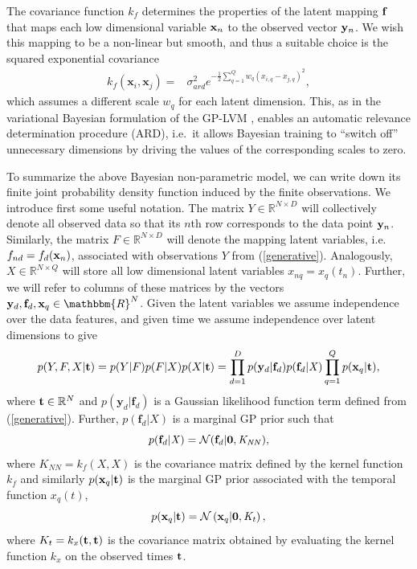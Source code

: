 \documentclass{article} %
\begin{document}
% 
The covariance function $k_f$ determines the properties of the latent
mapping $\mathbf{f}$ that maps each low dimensional variable $\mathbf{x}_n$ to the
observed vector $\mathbf{y}_n$. We wish this mapping to be a non-linear but
smooth, and thus a suitable choice is the squared exponential
covariance
\begin{align}
\mathit{k_f} \left( \mathbf{x}_i, \mathbf{x}_j \right) = {} &  
		\sigma_{ard}^2 e^{
			- \frac{1}{2} \sum_{q=1}^{Q}  w_q \left(
                          \mathit{x_{i,q} - x_{j,q}} \right) ^2 },
\label{rbfard}
\end{align}
which assumes a different scale $w_q$ for each latent dimension. This,
as in the variational Bayesian formulation of the GP-LVM
\cite{BayesianGPLVM}, enables an automatic relevance determination
procedure (ARD), i.e.\ it allows Bayesian training to ``switch off''
unnecessary dimensions by driving the values of the corresponding
scales to zero.

To summarize the above Bayesian non-parametric model, we can write
down its finite joint probability density function induced by the
finite observations. We introduce first some useful notation. The
matrix $\mathit{Y} \in \mathbb{R}^{N \times D}$ will collectively
denote all observed data so that its $n$th row corresponds to the data
point $\mathbf{y}_n$. Similarly, the matrix $F \in \mathbb{R}^{N \times D}$
will denote the mapping latent variables, i.e.\ $f_{nd} =f_d(\mathbf{x}_n)$,
associated with observations $Y$ from (\ref{generative}). Analogously,
$X \in \mathbb{R}^{N \times Q}$ will store all low dimensional latent
variables $x_{nq}=x_q(t_n)$. Further, we will refer to columns of
these matrices by the vectors $\bfy_d,\bff_d, \bfx_q \in
\mathbbm{R}^N$. Given the latent variables we assume independence over
the data features, and given time we assume independence over latent
dimensions to give
\begin{equation}
\label{joint}
p(Y,F, X | \mathbf{t}) = p(Y|F) p(F|X) p(X |\mathbf{t})= 
 \prod_{d=1}^D  p(\mathbf{y}_d | \mathbf{f}_d) p(\mathbf{f}_d |
 \mathit{X}) \prod_{q=1}^Q p(\mathbf{x}_q | \mathbf{t}),
\end{equation}
where $\mathbf{t} \in \mathbb{R}^N$ and $p(\mathbf{y}_d | \mathbf{f}_d)$ 
is a Gaussian likelihood function term defined from  (\ref{generative}). 
Further, $p(\mathbf{f}_d | \mathit{X})$ is a marginal GP prior 
such that 
\begin{equation}
\label{priorF}
p(\mathbf{f}_d | \mathit{X}) = \mathcal{N}(\mathbf{f}_d |\mathbf{0}, \mathit{K_{NN}}),
\end{equation}
where $\mathit{K}_{NN}= \mathit{k}_f(X,X)$ is the covariance matrix
defined by the kernel function $\mathit{k}_f$ and similarly 
$p(\mathbf{x}_q|\mathbf{t})$ is the marginal GP prior associated with 
the temporal function $x_q(t)$,  
\begin{equation}
p(\mathbf{x}_q|\mathbf{t}) = \mathcal{N} \left( \mathbf{x}_q | \mathbf{0},
  \mathit{K_t} \right),
\label{priorXgivenT}
\end{equation}
where $K_t = k_x(\mathbf{t},\mathbf{t})$ is the covariance matrix obtained by
evaluating the kernel function $\mathit{k}_x$ on the observed times
$\mathbf{t}$. 
 
\end{document}
